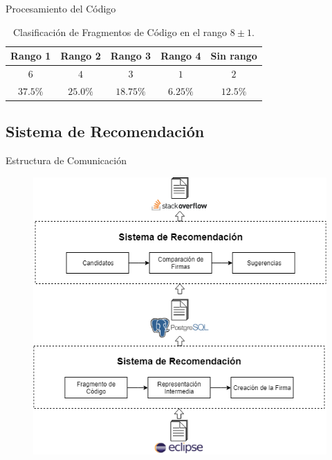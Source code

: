 \documentclass{beamer}
\begin{document}
\begin{frame}{Procesamiento del Código}
\begin{table}[h]
\caption{Clasificación de Fragmentos de Código en el rango $8\pm1$.}
\centering
\begin{tabular}{ccccc}
\hline
{Rango 1} & {Rango 2} & {Rango 3} & {Rango 4} & {Sin rango} \\
\hline
$6$ & $4$ & $3$ & $1$ & $2$ \\
$37.5\%$ & $25.0\%$ & $18.75\%$ & $6.25\%$ & $12.5\%$ \\
\hline
\end{tabular}
\end{table}
\end{frame}

\subsection{Sistema de Recomendación}
\begin{frame}{Estructura de Comunicación}
\begin{figure}
\includegraphics[width=0.6\linewidth]{comunicacion}
\end{figure}
\end{frame}
\end{document}

